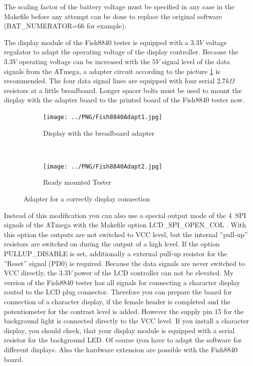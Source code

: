 The scaling factor of the battery voltage must be specified in any case in the Makefile before any
attempt can be done to replace the original software (BAT\_NUMERATOR=66 for example).

The display module of the Fish8840 tester is equipped with a \(3.3V\) voltage regulator to adapt
the operating voltage of the display controller.
Because the \(3.3V\) operating voltage can be increased with the \(5V\) signal level of the data signals
from the ATmega, a adapter circuit according to the picture \ref{fig:Fish8840Adapt} is recommended.
The four data signal lines are equipped with four serial \(2.7k\Omega\) resistors at a little
breadboard.
Longer spacer bolts must be used to mount the display with the adapter board to the printed board
of the Fish8840 tester now.

\begin{figure}[H]
  \begin{subfigure}[b]{9cm}
    \centering
    \texttt{[image: ../PNG/Fish8840Adapt1.jpg]}
    \caption{Display with the breadboard adapter}
  \end{subfigure}
  ~
  \begin{subfigure}[b]{9cm}
    \centering
    \texttt{[image: ../PNG/Fish8840Adapt2.jpg]}
    \caption{Ready mounted Tester}
  \end{subfigure}
  \caption{Adapter for a correctly display connection}
  \label{fig:Fish8840Adapt}
\end{figure}

Instead of this modification you can also use a special output mode of the 4~SPI signals of the ATmega
with the Makefile option LCD\_SPI\_OPEN\_COL .
With this option the outputs are not switched to VCC level,
but the internal ''pull-up'' resistors are switched on during the output of a high level.
If the option PULLUP\_DISABLE is set, additionally a external pull-up resistor for
the ''Reset'' signal (PD0) is required.
Because the data signals are never switched to VCC directly, the \(3.3V\) power of the LCD controller
can not be elevated.
My version of the Fish8840 tester has all signals for connecting a character display
routed to the LCD plug connector.
Therefore you can prepare the board for connection of a character display, if the
female header is completed and the potentiometer for the contrast level is added.
However the supply pin 15 for the background light is connected directly to the VCC level.
If you install a character display, you should check, that your display module
is equipped with a serial resistor for the background LED.
Of course iyou have to adapt the software for different displays. 
Also the hardware extension are possible with the Fish8840 board.\\

